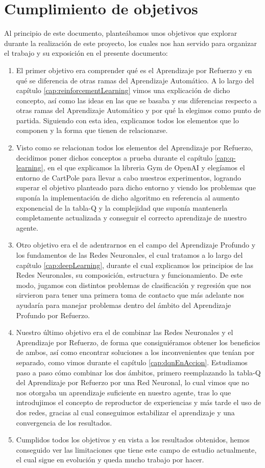 \section{Cumplimiento de objetivos}

Al principio de este documento, planteábamos unos objetivos que explorar durante la realización de este proyecto, los cuales nos han servido para organizar el trabajo y su exposición en el presente documento:

\begin{enumerate}
        \item El primer objetivo era comprender qué es el Aprendizaje por Refuerzo y en qué se diferencia de otras ramas del Aprendizaje Automático. A lo largo del capítulo \ref{cap:reinforcementLearning} vimos una explicación de dicho concepto, así como las ideas en las que se basaba y sus diferencias respecto a otras ramas del Aprendizaje Automático y por qué la elegimos como punto de partida. Siguiendo con esta idea, explicamos todos los elementos que lo componen y la forma que tienen de relacionarse.
        \item Visto como se relacionan todos los elementos del Aprendizaje por Refuerzo, decidimos poner dichos conceptos a prueba durante el capítulo \ref{cap:q-learning}, en el que explicamos la libreria Gym de OpenAI y elegíamos el entorno de CartPole para llevar a cabo nuestros experimentos, logrando superar el objetivo planteado para dicho entorno y viendo los problemas que suponía la implementación de dicho algoritmo en referencia al aumento exponencial de la tabla-Q y la complejidad que suponía mantenerla completamente actualizada y conseguir el correcto aprendizaje de nuestro agente.
        \item Otro objetivo era el de adentrarnos en el campo del Aprendizaje Profundo y los fundamentos de las Redes Neuronales, el cual tratamos a lo largo del capítulo \ref{cap:deepLearning}, durante el cual explicamos los principios de las Redes Neuronales, su composición, estructura y funcionamiento. De este modo, jugamos con distintos problemas de clasificación y regresión que nos sirvieron para tener una primera toma de contacto que más adelante nos ayudaría para manejar problemas dentro del ámbito del Aprendizaje Profundo por Refuerzo.
        \item Nuestro último objetivo era el de combinar las Redes Neuronales y el Aprendizaje por Refuerzo, de forma que consiguiéramos obtener los beneficios de ambos, así como encontrar soluciones a los inconvenientes que tenían por separado, como vimos durante el capítulo \ref{cap:dqnEnAccion}. Estudiamos paso a paso cómo combinar los dos ámbitos, primero reemplazando la tabla-Q del Aprendizaje por Refuerzo por una Red Neuronal, lo cual vimos que no nos otorgaba un aprendizaje suficiente en nuestro agente, tras lo que introdujimos el concepto de reproductor de experiencias y más tarde el uso de dos redes, gracias al cual conseguimos estabilizar el aprendizaje y una convergencia de los resultados.
        \item Cumplidos todos los objetivos y en vista a los resultados obtenidos, hemos conseguido ver las limitaciones que tiene este campo de estudio actualmente, el cual sigue en evolución y queda mucho trabajo por hacer.
\end{enumerate}

